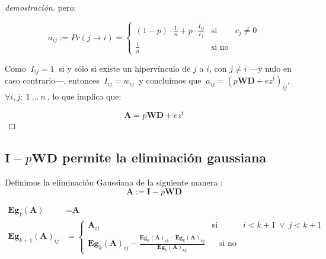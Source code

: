 \begin{proof}[demostración]
\noindent pero: 
\vspace{1em}

\begin{equation*}
    a_{ij} := Pr(j \longrightarrow i) = \left\{ 
                                            \begin{array}{lcc}
                                            (1 - p)\cdot \frac{1}{n} + p \cdot \frac{I_{ij}}{c_j}      &  \text{si}    & c_j \neq 0\\
                                            \frac{1}{n}                                                &  \text{si no}  &
                                            \end{array}
                                        \right.
\end{equation*}
\vspace{1em}

\noindent Como $\ I_{ij} = 1\ $ si y sólo si existe un hipervínculo de $j$ a $i$, con $j \neq i$ ---y nulo en caso contrario---, entonces $\ I_{ij} = w_{ij}\ $ y concluímos que $\ a_{ij} = (p\textbf{W}\textbf{D} + ez^t)_{ij}$, $\forall i, j:\ 1\ ...\ n\ $,  lo que implica que:
\vspace{1em}

\begin{equation*}
    \textbf{A} = p\textbf{W}\textbf{D} + ez^t
\end{equation*}
\vspace{1em}

\end{proof}


\subsection{$\textbf{I} - p\textbf{W}\textbf{D}$ permite la eliminación gaussiana}\label{A.2}


Definimos la eliminación Gaussiana de la siguiente manera : \\

\begin{equation*}
\textbf{A} := \textbf{I} - p\textbf{WD}
\end{equation*}

\begin{align*}
    \textbf{Eg}_{1}(\textbf{A}) \ \ \  &=   \textbf{A}
                            \\
    \textbf{Eg}_{k+1}(\textbf{A})_{ij}  &=  \left\{ 
                                    \begin{array}{lcc}
                                    \textbf{A}_{ij}   &   \text{si}    & i < k+1 \ \vee \  j < k+1 \\
                                    \textbf{Eg}_{k}(\textbf{A})_{ij} - \frac {\textbf{Eg}_{k}(\textbf{A})_{ik} \ \cdot \ \textbf{Eg}_{k}(\textbf{A})_{kj}}{\textbf{Eg}_{k}(\textbf{A})_{kk}}    &  \ \ \ \  \text{si no} &
                                    \end{array}
                                \right.\
\end{align*}



